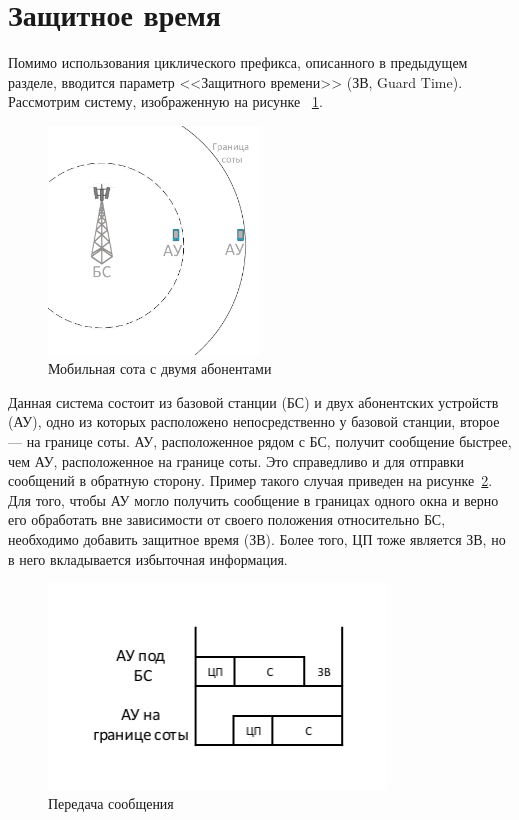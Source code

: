 \section{Защитное время}
Помимо использования циклического префикса, описанного в предыдущем разделе, вводится параметр <<Защитного времени>> (ЗВ, Guard Time).
Рассмотрим систему, изображенную на рисунке ~\ref{fig:vol_mobile_cell}.
\begin{figure}[H]
    \centering
    \includegraphics[width=0.5\textwidth]{img/vol_mobile_cell}
    \caption{Мобильная сота с двумя абонентами}
    \label{fig:vol_mobile_cell}
\end{figure}

Данная система состоит из базовой станции (БС) и двух абонентских устройств (АУ), одно из которых
расположено непосредственно у базовой станции, второе --- на границе соты. АУ, расположенное рядом с
БС, получит сообщение быстрее, чем АУ, расположенное на границе соты. Это справедливо и для отправки
сообщений в обратную сторону. Пример такого случая приведен на рисунке~\ref{fig:vol_CP}.
Для того, чтобы АУ могло получить сообщение в границах одного окна и верно его
обработать вне зависимости от своего положения относительно БС, необходимо добавить защитное время
(ЗВ). Более того, ЦП тоже является ЗВ, но в него вкладывается избыточная информация.
\begin{figure}[H]
    \centering
    \includegraphics[width=0.8\textwidth]{img/vol_CP}
    \caption{Передача сообщения}
    \label{fig:vol_CP}
\end{figure}

